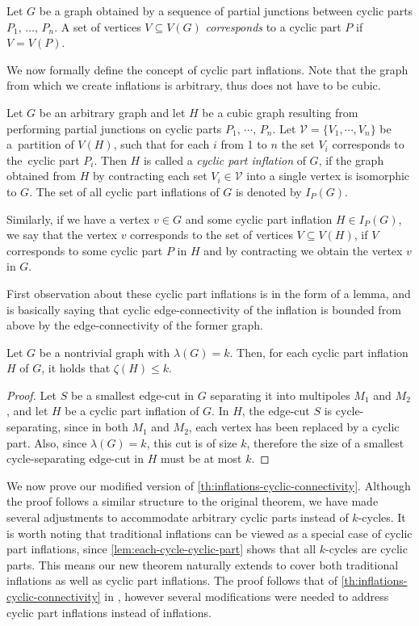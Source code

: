 \documentclass[12pt, twoside]{book}
\begin{document}
Let $G$ be a graph obtained by a sequence of partial junctions between cyclic parts $P_1,\,\dots,\,P_n$. A set of vertices $V\subseteq V(G)$ \textit{corresponds} to a cyclic part $P$ if $V=V(P)$.

We now formally define the concept of cyclic part inflations. Note that the graph from which we create inflations is arbitrary, thus does not have to be cubic.

\begin{definition}
	\label{def:cyclic-part-inflation}
	Let $G$ be an arbitrary graph and let $H$ be a cubic graph resulting from performing partial junctions on cyclic parts $P_1,\,\cdots,\,P_n$. Let $\mathcal{V}=\{V_1,\cdots, V_n\}$ be a~partition of $V(H)$, such that for each $i$ from 1 to $n$ the set $V_i$ corresponds to the~cyclic part $P_i$. Then $H$ is called a \textit{cyclic part inflation} of $G$, if the graph obtained from $H$ by contracting each set $V_i\in \mathcal{V}$ into a single vertex is isomorphic to $G$. The set of all cyclic part inflations of $G$ is denoted by $I_P(G)$.
\end{definition}

Similarly, if we have a vertex $v\in G$ and some cyclic part inflation $H\in I_P(G)$, we say that the vertex $v$ corresponds to the set of vertices $V\subseteq V(H)$, if $V$ corresponds to some cyclic part $P$ in $H$ and by contracting we obtain the vertex $v$ in $G$.

First observation about these cyclic part inflations is in the form of a lemma, and is basically saying that cyclic edge-connectivity of the inflation is bounded from above by the edge-connectivity of the former graph.

\begin{lemma}
	Let $G$ be a nontrivial graph with $\lambda(G)=k$. Then, for each cyclic part inflation $H$ of $G$, it holds that $\zeta(H)\leq k$.
\end{lemma}

\begin{proof}
	Let $S$ be a smallest edge-cut in $G$ separating it into multipoles $M_1$ and $M_2$, and let $H$ be a cyclic part inflation of $G$. In $H$, the edge-cut $S$ is cycle-separating, since in both $M_1$ and $M_2$, each vertex has been replaced by a cyclic part. Also, since $\lambda(G)=k$, this cut is of size $k$, therefore the size of a smallest cycle-separating edge-cut in $H$ must be at most $k$.
\end{proof}

We now prove our modified version of \cref{th:inflations-cyclic-connectivity}. Although the proof follows a similar structure to the original theorem, we have made several adjustments to accommodate arbitrary cyclic parts instead of $k$-cycles. It is worth noting that traditional inflations can be viewed as a special case of cyclic part inflations, since \cref{lem:each-cycle-cyclic-part} shows that all $k$-cycles are cyclic parts. This means our new theorem naturally extends to cover both traditional inflations as well as cyclic part inflations. The proof follows that of \cref{th:inflations-cyclic-connectivity} in \cite{HISTs}, however several modifications were needed to address cyclic part inflations instead of inflations.
\end{document}
